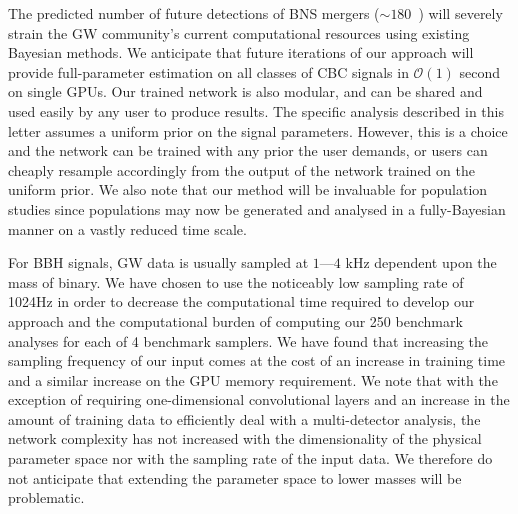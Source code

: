 %
%
The predicted number of future detections of \ac{BNS} mergers ($\sim
180$~\cite{2018LRR....21....3A}) will severely strain the \ac{GW} community's
current computational resources using existing Bayesian methods. We anticipate
that future iterations of our approach will provide full-parameter estimation
on all classes of \ac{CBC} signals in $\mathcal{O}(1)$ second on single
\acp{GPU}. Our trained network is also modular, and can be shared and used
easily by any user to produce results. The specific analysis described in this
letter assumes a uniform prior on the signal parameters. However, this is a
choice and the network can be trained with any prior the user demands, or users
can cheaply resample accordingly from the output of the network trained on the
uniform prior. We also note that our method will be invaluable for population
studies since populations may now be generated and analysed in a fully-Bayesian
manner on a vastly reduced time scale. 

%
%
For \ac{BBH} signals, \ac{GW} data is usually sampled at $1$---$4$ kHz
dependent upon the mass of binary. We have chosen to use the noticeably low
sampling rate of 1024Hz in order to decrease the computational time
required to develop our approach and the computational burden of computing our
250 benchmark analyses for each of 4 benchmark samplers.  We have found that 
increasing the sampling frequency of our input comes at the cost of an increase 
in training time and a similar increase on the \ac{GPU} memory
requirement. We note that with the exception of requiring one-dimensional
convolutional layers and an increase in the amount of training data to
efficiently deal with a multi-detector analysis, the network complexity has not
increased  
with the dimensionality of the physical parameter space nor with the
sampling rate of the input data. We therefore do not anticipate that extending
the parameter space to lower masses will be problematic. 

